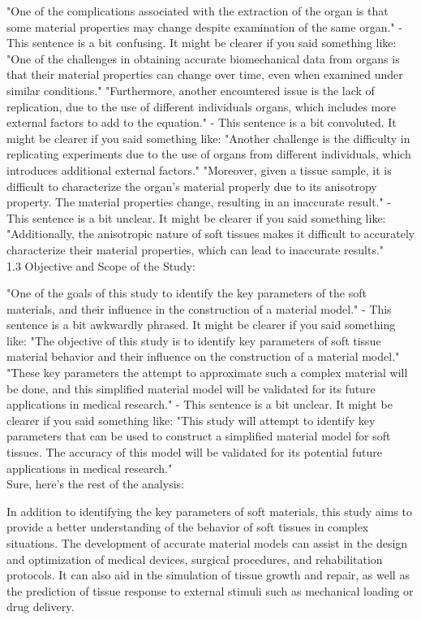 "One of the complications associated with the extraction of the organ is that some material properties may change despite examination of the same organ." - This sentence is a bit confusing. It might be clearer if you said something like: "One of the challenges in obtaining accurate biomechanical data from organs is that their material properties can change over time, even when examined under similar conditions."
"Furthermore, another encountered issue is the lack of replication, due to the use of different individuals organs, which includes more external factors to add to the equation." - This sentence is a bit convoluted. It might be clearer if you said something like: "Another challenge is the difficulty in replicating experiments due to the use of organs from different individuals, which introduces additional external factors."
"Moreover, given a tissue sample, it is difficult to characterize the organ’s material properly due to its anisotropy property. The material properties change, resulting in an inaccurate result." - This sentence is a bit unclear. It might be clearer if you said something like: "Additionally, the anisotropic nature of soft tissues makes it difficult to accurately characterize their material properties, which can lead to inaccurate results."\\
1.3 Objective and Scope of the Study:

"One of the goals of this study to identify the key parameters of the soft materials, and their influence in the construction of a material model." - This sentence is a bit awkwardly phrased. It might be clearer if you said something like: "The objective of this study is to identify key parameters of soft tissue material behavior and their influence on the construction of a material model."
"These key parameters the attempt to approximate such a complex material will be done, and this simplified material model will be validated for its future applications in medical research." - This sentence is a bit unclear. It might be clearer if you said something like: "This study will attempt to identify key parameters that can be used to construct a simplified material model for soft tissues. The accuracy of this model will be validated for its potential future applications in medical research."\\
Sure, here's the rest of the analysis:

In addition to identifying the key parameters of soft materials, this study aims to provide a better understanding of the behavior of soft tissues in complex situations. The development of accurate material models can assist in the design and optimization of medical devices, surgical procedures, and rehabilitation protocols. It can also aid in the simulation of tissue growth and repair, as well as the prediction of tissue response to external stimuli such as mechanical loading or drug delivery.

